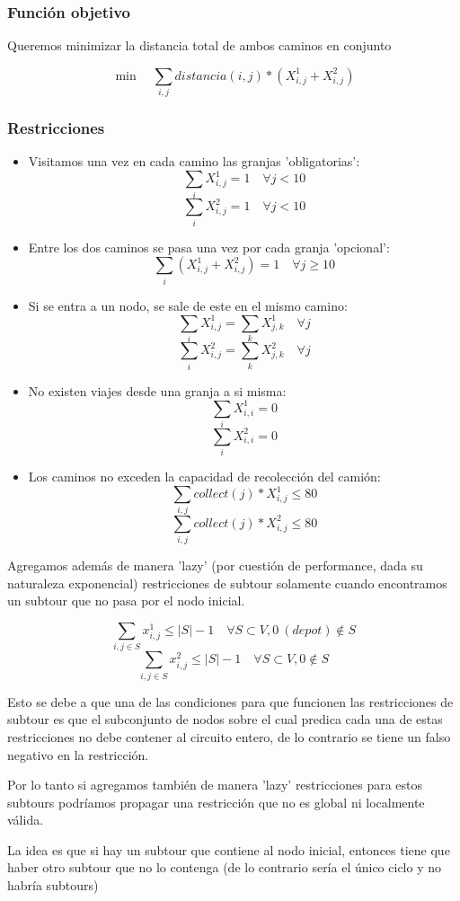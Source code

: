 \subsubsection{Función objetivo}
Queremos minimizar la distancia total de ambos caminos en conjunto

$$\min \quad \sum_{i,j} distancia(i,j)*(X^1_{i,j} + X^2_{i,j}) $$
\subsubsection{Restricciones}

\begin{itemize}
    \item Visitamos una vez en cada camino las granjas 'obligatorias':
    $$ \sum_{i} X^1_{i,j} = 1 \quad \forall j < 10 $$
    $$ \sum_{i} X^2_{i,j} = 1 \quad \forall j < 10 $$

    \item Entre los dos caminos se pasa una vez por cada granja 'opcional':
    $$ \sum_{i} (X^1_{i,j} + X^2_{i,j}) = 1 \quad \forall j \geq 10 $$

    \item Si se entra a un nodo, se sale de este en el mismo camino:
    $$ \sum_{i} X^1_{i,j} = \sum_{k} X^1_{j,k}  \quad \forall j $$
    $$ \sum_{i} X^2_{i,j} = \sum_{k} X^2_{j,k}  \quad \forall j $$

    \item No existen viajes desde una granja a si misma:
    $$ \sum_{i} X^1_{i,i} = 0 $$
    $$ \sum_{i} X^2_{i,i} = 0 $$

    \item Los caminos no exceden la capacidad de recolección del camión:
    $$ \sum_{i,j} collect(j)*X^1_{i,j} \leq 80 $$
    $$ \sum_{i,j} collect(j)*X^2_{i,j} \leq 80 $$

\end{itemize}

Agregamos además de manera 'lazy' (por cuestión de performance, dada su naturaleza exponencial) restricciones de subtour solamente cuando encontramos un subtour que no pasa por el nodo inicial.

$$ \sum_{i,j \in S} x^1_{i,j} \leq |S|-1 \quad \forall S \subset V, 0\ (depot) \not \in S $$
$$ \sum_{i,j \in S} x^2_{i,j} \leq |S|-1 \quad \forall S \subset V, 0 \not \in S $$


Esto se debe a que una de las condiciones para que funcionen las restricciones de subtour es que el subconjunto de nodos sobre el cual predica cada una de estas restricciones no debe contener al circuito entero, de lo contrario se tiene un falso negativo en la restricción.

Por lo tanto si agregamos también de manera 'lazy' restricciones para estos subtours podríamos propagar una restricción que no es global ni localmente válida.

La idea es que si hay un subtour que contiene al nodo inicial, entonces tiene que haber otro subtour que no lo contenga (de lo contrario sería el único ciclo y no habría subtours)
